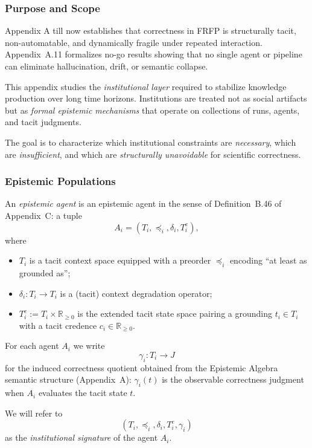 

\subsubsection{Purpose and Scope}

Appendix A till now establishes that correctness in FRFP is structurally tacit,
non-automatable, and dynamically fragile under repeated interaction.
Appendix~A.11 formalizes no-go results showing that no single agent or pipeline
can eliminate hallucination, drift, or semantic collapse.

This appendix studies the \emph{institutional layer} required to stabilize
knowledge production over long time horizons.  Institutions are treated not
as social artifacts but as \emph{formal epistemic mechanisms} that operate on
collections of runs, agents, and tacit judgments.

The goal is to characterize which institutional constraints are
\emph{necessary}, which are \emph{insufficient}, and which are
\emph{structurally unavoidable} for scientific correctness.

\subsubsection{Epistemic Populations}
\label{sec:appendix-E1}

\begin{definition}\label{def:B82}
An \emph{epistemic agent} is an epistemic agent in the sense of Definition~B.46 of Appendix~C: a tuple
\[
  A_i = (T_i, \preceq_i, \delta_i, T^e_i),
\]
where
\begin{itemize}
  \item $T_i$ is a tacit context space equipped with a preorder $\preceq_i$ encoding ``at least as grounded as'';
  \item $\delta_i : T_i \to T_i$ is a (tacit) context degradation operator;
  \item $T^e_i := T_i \times \mathbb{R}_{\ge 0}$ is the extended tacit state space pairing a grounding $t_i \in T_i$ with a tacit credence $c_i \in \mathbb{R}_{\ge 0}$.
\end{itemize}
For each agent $A_i$ we write
\[
  \gamma_i : T_i \to J
\]
for the induced correctness quotient obtained from the Epistemic Algebra semantic structure (Appendix~A): $\gamma_i(t)$ is the observable correctness judgment when $A_i$ evaluates the tacit state $t$.

We will refer to
\[
  (T_i, \preceq_i, \delta_i, T^e_i, \gamma_i)
\]
as the \emph{institutional signature} of the agent $A_i$.
\end{definition}


